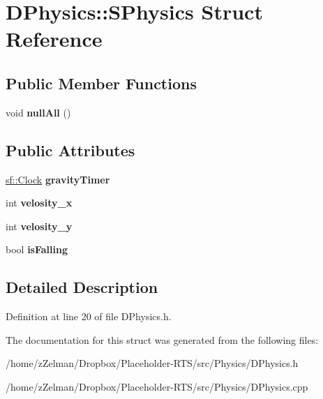 \hypertarget{structDPhysics_1_1SPhysics}{\section{D\-Physics\-:\-:S\-Physics Struct Reference}
\label{structDPhysics_1_1SPhysics}
}
\subsection*{Public Member Functions}
\begin{DoxyCompactItemize}
\item 
\hypertarget{structDPhysics_1_1SPhysics_aa4cf9f9d5ae6ab52b53a76d7bc507e55}{void {\bfseries null\-All} ()}\label{structDPhysics_1_1SPhysics_aa4cf9f9d5ae6ab52b53a76d7bc507e55}

\end{DoxyCompactItemize}
\subsection*{Public Attributes}
\begin{DoxyCompactItemize}
\item 
\hypertarget{structDPhysics_1_1SPhysics_aee2f0f80a53a905eb9de32d3bb12e318}{\hyperlink{classsf_1_1Clock}{sf\-::\-Clock} {\bfseries gravity\-Timer}}\label{structDPhysics_1_1SPhysics_aee2f0f80a53a905eb9de32d3bb12e318}

\item 
\hypertarget{structDPhysics_1_1SPhysics_a2654e1fd65ea35fe4119c7866fd46274}{int {\bfseries velosity\-\_\-x}}\label{structDPhysics_1_1SPhysics_a2654e1fd65ea35fe4119c7866fd46274}

\item 
\hypertarget{structDPhysics_1_1SPhysics_a58c1f8fa61d0aeece450d7ab789c5013}{int {\bfseries velosity\-\_\-y}}\label{structDPhysics_1_1SPhysics_a58c1f8fa61d0aeece450d7ab789c5013}

\item 
\hypertarget{structDPhysics_1_1SPhysics_a39163a65d84fc6d7fd0be57560cffe12}{bool {\bfseries is\-Falling}}\label{structDPhysics_1_1SPhysics_a39163a65d84fc6d7fd0be57560cffe12}

\end{DoxyCompactItemize}


\subsection{Detailed Description}


Definition at line 20 of file D\-Physics.\-h.



The documentation for this struct was generated from the following files\-:\begin{DoxyCompactItemize}
\item 
/home/z\-Zelman/\-Dropbox/\-Placeholder-\/\-R\-T\-S/src/\-Physics/D\-Physics.\-h\item 
/home/z\-Zelman/\-Dropbox/\-Placeholder-\/\-R\-T\-S/src/\-Physics/D\-Physics.\-cpp\end{DoxyCompactItemize}
